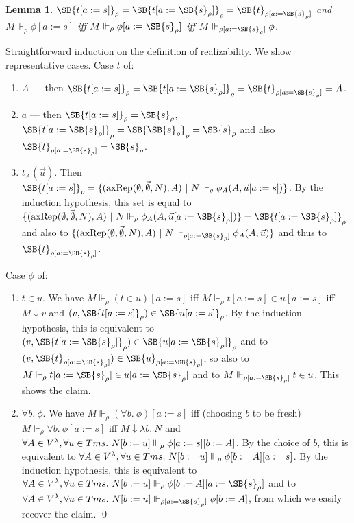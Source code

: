 \documentclass{LMCS}
\newtheorem{lemma}[thm]{Lemma}
\newcommand\reals{\ensuremath{\Vdash}}
\newcommand{\rrho}{\reals_\rho}
\newcommand{\pl}[1]{\ensuremath{\mathrm{#1}}}
\newcommand{\sr}[1]{\ensuremath{\SB{#1}_\rho}}
\begin{document}
\begin{lemma}\label{realsubst}
$\SB{t[a:=s]}_\rho = \SB{t[a:=\SB{s}_\rho]}_\rho = \SB{t}_{\rho[a:=\SB{s}_\rho]}$ and $M \reals_\rho
\phi[a:=s]$ iff $M \reals_\rho \phi[a:=\SB{s}_\rho]$ iff $M \reals_{\rho[a:=\SB{s}_\rho]} \phi$.
\end{lemma}
\proof Straightforward induction on the definition of realizability. We show representative
cases. Case $t$ of:
\begin{enumerate}[$\bullet$]
\item $A$ --- then $\SB{t[a:=s]}_\rho = \SB{t[a:=\SB{s}_\rho]}_\rho =
\SB{t}_{\rho[a:=\SB{s}_\rho]} = A$. 
\item $a$ --- then $\sr{t[a:=s]} = \sr{s}$, $\sr{t[a:=\sr{s}]} = \sr{\sr{s}}
= \sr{s}$ and also $\SB{t}_{\rho[a:=\sr{s}]} = \sr{s}$.
\item $t_A(\vec{u})$. Then $\sr{t[a:=s]} = \{ (\pl{axRep}(\emptyset,
\vec{\emptyset}, N), A)\
|\ N \rrho \phi_A(A, \vec{u}[a:=s]) \}$. By the induction
hypothesis, this set is equal to $\{ (\pl{axRep}(\emptyset,
\vec{\emptyset}, N), A)\ |\ N \rrho \phi_A(A, \vec{u}[a:=\sr{s}]) \} = \sr{t[a:=\sr{s}]}$
and also to 
$\{ (\pl{axRep}(\emptyset, \vec{\emptyset}, N), A)\ |\ 
N \reals_{\rho[a:=\sr{s}]} \phi_A(A, \vec{u}) \}$ and thus to 
$\SB{t}_{\rho[a:=\sr{s}]}$. 
\end{enumerate}
Case $\phi$ of:
\begin{enumerate}[$\bullet$]
\item $t \in u$. We have $M \rrho (t \in u)[a:=s]$ iff $M \rrho t[a:=s] \in
u[a:=s]$ iff $M \downarrow v$ and $(v, \sr{t[a:=s]}) \in \sr{u[a:=s]}$. By
the induction hypothesis, this is equivalent to $(v,
\SB{t[a:=\SB{s}_\rho]}_\rho) \in \SB{u[a:=\SB{s}_\rho]}_\rho$ and to
$(v, \SB{t}_{\rho[a:=\SB{s}_\rho]}) \in \SB{u}_{\rho[a:=\SB{s}_\rho]}$, so
also to $M \rrho t[a:=\SB{s}_\rho] \in
u[a:=\SB{s}_\rho]$ and to $M \reals_{\rho[a:=\SB{s}_\rho]} t
\in u$. This shows the claim.
\item $\forall b.\ \phi$. We have $M \rrho (\forall b.\ \phi)[a:=s]$ iff
(choosing $b$ to be fresh) $M \rrho \forall b.\ \phi[a:=s]$ iff $M
\downarrow \lambda b.\ N$ and $\forall A \in \vl, \forall u \in Tms.\ N[b:=u]
\rrho \phi[a:=s][b:=A]$. By the choice of $b$, this is equivalent to
$\forall A \in \vl, \forall u \in Tms.\ N[b:=u] \rrho \phi[b:=A][a:=s]$. By the induction hypothesis, this is equivalent to
$\forall A \in \vl, \forall u \in Tms.\ N[b:=u] \rrho \phi[b:=A][a:=\sr{s}]$
and to $\forall A \in \vl, \forall u \in Tms.\ N[b:=u] \reals_{\rho[a:=\sr{s}]}
\phi[b:=A]$, from which we easily recover the claim. \qed
\end{enumerate}
\end{document}
